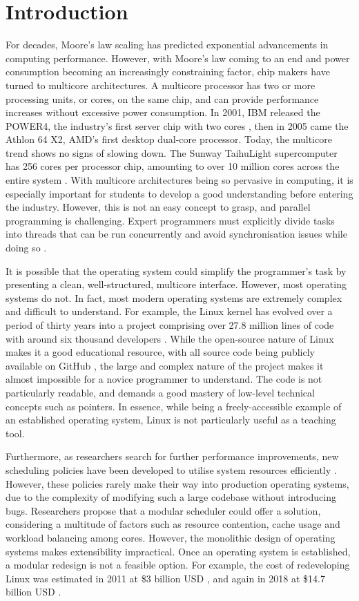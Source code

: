 \documentclass[bsc,frontabs,singlespacing,parskip,deptreport]{infthesis}
\begin{document}
\chapter{Introduction}
For decades, Moore’s law scaling has predicted exponential advancements in computing performance. However, with Moore’s law coming to an end and power consumption becoming an increasingly constraining factor, chip makers have turned to multicore architectures. A multicore processor has two or more processing units, or cores, on the same chip, and can provide performance increases without excessive power consumption. In 2001, IBM released the POWER4, the industry’s first server chip with two cores \cite{power4}, then in 2005 came the Athlon 64 X2, AMD’s first desktop dual-core processor. Today, the multicore trend shows no signs of slowing down. The Sunway TaihuLight supercomputer has 256 cores per processor chip, amounting to over 10 million cores across the entire system \cite{sunway}. With multicore architectures being so pervasive in computing, it is especially important for students to develop a good understanding before entering the industry. However, this is not an easy concept to grasp, and parallel programming is challenging. Expert programmers must explicitly divide tasks into threads that can be run concurrently and avoid synchronisation issues while doing so \cite{geer}. 

It is possible that the operating system could simplify the programmer's task by presenting a clean, well-structured, multicore interface. However, most operating systems do not. In fact, most modern operating systems are extremely complex and difficult to understand. For example, the Linux kernel has evolved over a period of thirty years into a project comprising over 27.8 million lines of code \cite{linux-loc} with around six thousand developers \cite{linux-kernel}. While the open-source nature of Linux makes it a good educational resource, with all source code being publicly available on GitHub \cite{linux-github}, the large and complex nature of the project makes it almost impossible for a novice programmer to understand. The code is not particularly readable, and demands a good mastery of low-level technical concepts such as pointers. In essence, while being a freely-accessible example of an established operating system, Linux is not particularly useful as a teaching tool. 

Furthermore, as researchers search for further performance improvements, new scheduling policies have been developed to utilise system resources efficiently \cite{wasted-cores}. However, these policies rarely make their way into production operating systems, due to the complexity of modifying such a large codebase without introducing bugs. Researchers propose that a modular scheduler could offer a solution, considering a multitude of factors such as resource contention, cache usage and workload balancing among cores. However, the monolithic design of operating systems makes extensibility impractical. Once an operating system is established, a modular redesign is not a feasible option. For example, the cost of redeveloping Linux was estimated in 2011 at \$3 billion USD \cite{linux-kernel-cost}, and again in 2018 at \$14.7 billion USD \cite{cost-to-redev}. 
\end{document}
